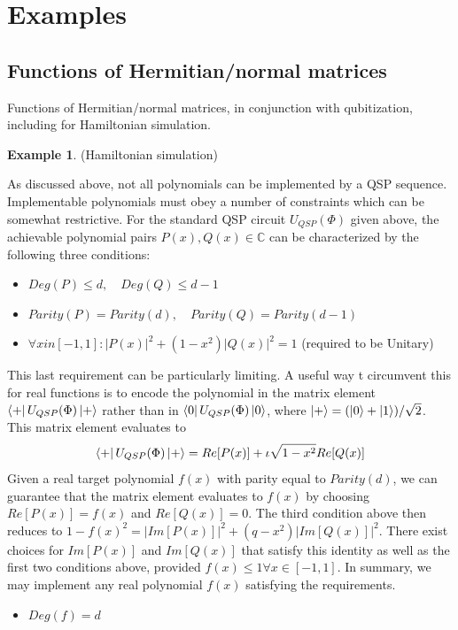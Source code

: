 \documentclass[12pt, oneside]{book}
\theoremstyle{definition}
\theoremstyle{definition}
\newtheorem{example}{Example}[section]
\theoremstyle{remark}
\begin{document}
\section{Examples}
\subsection{Functions of Hermitian/normal matrices}
Functions of Hermitian/normal matrices, in conjunction with qubitization, including for Hamiltonian simulation.
\begin{example}
    (Hamiltonian simulation)
    
\end{example}


\begin{importantnote}
    As discussed above, not all polynomials can be implemented by a QSP sequence. Implementable polynomials must obey a number of constraints which can be somewhat restrictive. For the standard QSP circuit $U_{QSP}(\Phi)$ given above, the achievable polynomial pairs $P(x),Q(x)\in\mathbb{C}$ can be characterized by the following three conditions:
    \begin{itemize}
        \item $Deg(P)\leq d,\quad Deg(Q)\leq d-1$
        \item $Parity(P)=Parity(d),\quad Parity(Q)=Parity(d-1)$
        \item $\forall x in[-1,1]: |P(x)|^2 + (1-x^2)|Q(x)|^2=1$ (required to be Unitary)
    \end{itemize}
    This last requirement can be particularly limiting. A useful way t circumvent this for real functions is to encode the polynomial in the matrix element $\bra{+}U_{QSP}(\Phi)\ket{+}$ rather than in $\bra{0}U_{QSP}(\Phi)\ket{0}$, where $\ket{+}=(\ket{0}+\ket{1})/\sqrt{2}$. This matrix element evaluates to 
    \[
    \bra{+}U_{QSP}(\Phi)\ket{+}=Re[P(x)]+\iota\sqrt{1-x^2}Re[Q(x)]
    \]
    Given a real target polynomial $f(x)$ with parity equal to $Parity(d)$, we can guarantee that the matrix element evaluates to $f(x)$ by choosing $Re[P(x)]=f(x)$ and $Re[Q(x)]=0$. The third condition above then reduces to $1-f(x)^2 = |Im[P(x)]|^2+(q-x^2)|Im[Q(x)]|^2$. There exist choices for $Im[P(x)]$ and $Im[Q(x)]$ that satisfy this identity as well as the first two conditions above, provided $f(x)\leq 1 \forall x \in[-1,1]$. In summary, we may implement any real polynomial $f(x)$ satisfying the requirements.
    \begin{itemize}
        \item $Deg(f)=d$

\end{itemize}
\end{importantnote}
\end{document}
